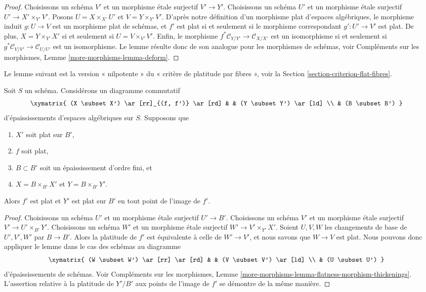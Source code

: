\begin{proof}
Choisissons un schéma $V'$ et un morphisme étale surjectif $V' \to Y'$.
Choisissons un schéma $U'$ et un morphisme étale surjectif
$U' \to X' \times_{Y'} V'$. Posons $U = X \times_{X'} U'$ et
$V = Y \times_{Y'} V'$. D'après notre définition d'un morphisme plat
d'espaces algébriques, le morphisme induit $g : U \to V$ est un morphisme plat
de schémas, et $f'$ est plat si et seulement si le morphisme correspondant
$g' : U' \to V'$ est plat. De plus, $X = Y \times_{Y'} X'$ si et seulement
si $U = V \times_{V'} V'$. Enfin, le morphisme
$f^*\mathcal{C}_{Y/Y'} \to \mathcal{C}_{X/X'}$
est un isomorphisme si et seulement si
$g^*\mathcal{C}_{V/V'} \to \mathcal{C}_{U/U'}$ est un isomorphisme.
Le lemme résulte donc de son analogue pour les morphismes de schémas, voir
Compléments sur les morphismes, Lemme \ref{more-morphisms-lemma-deform}.
\end{proof}

\noindent
Le lemme suivant est la version « nilpotente » du
« critère de platitude par fibres », voir la
Section \ref{section-criterion-flat-fibres}.

\begin{lemma}
\label{lemma-flatness-morphism-thickenings}
Soit $S$ un schéma. Considérons un diagramme commutatif
$$
\xymatrix{
(X \subset X') \ar[rr]_{(f, f')} \ar[rd] & & (Y \subset Y') \ar[ld] \\
& (B \subset B')
}
$$
d'épaississements d'espaces algébriques sur $S$. Supposons que
\begin{enumerate}
\item $X'$ soit plat sur $B'$,
\item $f$ soit plat,
\item $B \subset B'$ soit un épaississement d'ordre fini, et
\item $X = B \times_{B'} X'$ et $Y = B \times_{B'} Y'$.
\end{enumerate}
Alors $f'$ est plat et $Y'$ est plat sur $B'$ en tout point de
l'image de $f'$.
\end{lemma}

\begin{proof}
Choisissons un schéma $U'$ et un morphisme étale surjectif $U' \to B'$.
Choisissons un schéma $V'$ et un morphisme étale surjectif
$V' \to U' \times_{B'} Y'$.
Choisissons un schéma $W'$ et un morphisme étale surjectif
$W' \to V' \times_{Y'} X'$. Soient $U, V, W$ les changements de base
de $U', V', W'$ par $B \to B'$. Alors la platitude de $f'$ est
équivalente à celle de $W' \to V'$, et nous savons
que $W \to V$ est plat. Nous pouvons donc appliquer le lemme
dans le cas des schémas au diagramme
$$
\xymatrix{
(W \subset W') \ar[rr] \ar[rd] & & (V \subset V') \ar[ld] \\
& (U \subset U')
}
$$
d'épaississements de schémas. Voir
Compléments sur les morphismes, Lemme
\ref{more-morphisms-lemma-flatness-morphism-thickenings}.
L'assertion relative à la platitude de $Y'/B'$ aux points de
l'image de $f'$ se démontre de la même manière.
\end{proof}


